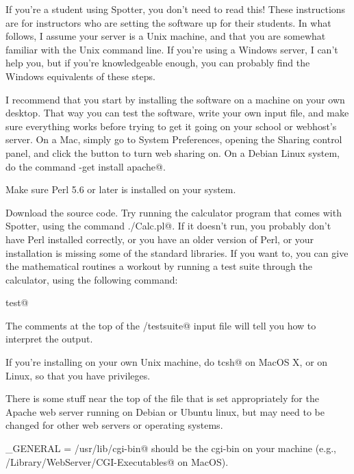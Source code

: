 \documentclass{doc}
\begin{document}
\label{setup}

If you're a student using Spotter, you don't need to read this!
These instructions are for instructors who are setting the software
up for their students. In what follows, I assume your server is
a Unix machine, and that you are somewhat familiar with the Unix
command line. If you're using a Windows server, I can't help you,
but if you're knowledgeable enough, you can probably find the Windows
equivalents of these steps. 

I recommend that you start by installing the software on a machine
on your own desktop. That way you can test the software, write your
own input file, and make sure everything works before trying to get
it going on your school or webhost's server. On a Mac,
 simply go to System Preferences, opening the Sharing control panel,
and click the button to turn web sharing on. On a Debian Linux
system, do the command \verb@apt-get install apache@.


Make sure Perl 5.6 or later is installed on your system.

Download the
source code. Try running the
calculator program that comes with Spotter, using the command
\verb@./Calc.pl@. If it doesn't run, you probably don't have Perl
installed correctly, or you have an older version of Perl, or your
installation is missing some of the standard libraries. If you want
to, you can give the mathematical routines a workout by running
a test suite through the calculator, using the following command:

\noindent\verb@make test@

The comments at the top of the \verb@tests/testsuite@ input file will
tell you how to interpret the output.

If you're
installing on your own Unix machine, do \verb@sudo tcsh@ on MacOS X,
or \verb@su@ on Linux, 
so that you have privileges.

There is some stuff near the top of the file \verb@Makefile@ that is set appropriately
for the Apache web server running on Debian or Ubuntu linux, but may need to be changed
for other web servers or operating systems.

\verb@CGI_GENERAL = /usr/lib/cgi-bin@ should be the cgi-bin on your machine (e.g.,
\verb@/Library/WebServer/CGI-Executables@ on MacOS). 
\end{document}

